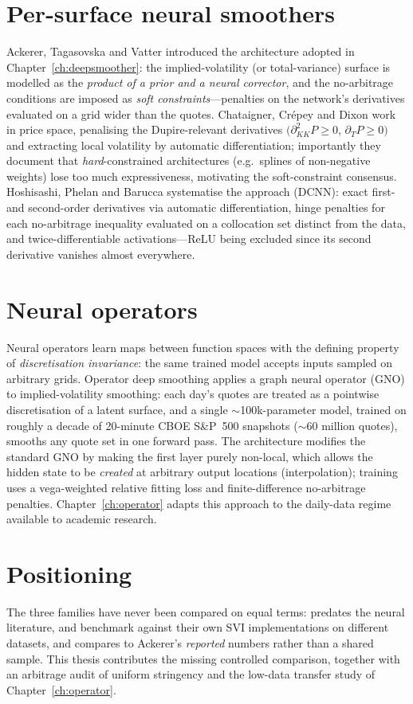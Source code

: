 \section{Per-surface neural smoothers}
Ackerer, Tagasovska and Vatter \cite{ackerer2020deep} introduced the architecture adopted in Chapter~\ref{ch:deepsmoother}: the implied-volatility (or total-variance) surface is modelled as the \emph{product of a prior and a neural corrector}, and the no-arbitrage conditions are imposed as \emph{soft constraints}---penalties on the network's derivatives evaluated on a grid wider than the quotes. Chataigner, Cr\'epey and Dixon \cite{chataigner2020deep} work in price space, penalising the Dupire-relevant derivatives $(\partial^2_{KK}P\ge0$, $\partial_T P\ge0)$ and extracting local volatility by automatic differentiation; importantly they document that \emph{hard}-constrained architectures (e.g.\ splines of non-negative weights) lose too much expressiveness, motivating the soft-constraint consensus. Hoshisashi, Phelan and Barucca \cite{hoshisashi2024noarbitrage} systematise the approach (DCNN): exact first- and second-order derivatives via automatic differentiation, hinge penalties for each no-arbitrage inequality evaluated on a collocation set distinct from the data, and twice-differentiable activations---ReLU being excluded since its second derivative vanishes almost everywhere.

\section{Neural operators}
Neural operators \cite{kovachki2023neural} learn maps between function spaces with the defining property of \emph{discretisation invariance}: the same trained model accepts inputs sampled on arbitrary grids. Operator deep smoothing \cite{gonon2024operator} applies a graph neural operator (GNO) to implied-volatility smoothing: each day's quotes are treated as a pointwise discretisation of a latent surface, and a single $\sim$100k-parameter model, trained on roughly a decade of 20-minute CBOE S\&P~500 snapshots ($\sim$60 million quotes), smooths any quote set in one forward pass. The architecture modifies the standard GNO by making the first layer purely non-local, which allows the hidden state to be \emph{created} at arbitrary output locations (interpolation); training uses a vega-weighted relative fitting loss and finite-difference no-arbitrage penalties. Chapter~\ref{ch:operator} adapts this approach to the daily-data regime available to academic research.

\section{Positioning}
The three families have never been compared on equal terms: \cite{gatheral2014arbitrage} predates the neural literature, \cite{ackerer2020deep} and \cite{hoshisashi2024noarbitrage} benchmark against their own SVI implementations on different datasets, and \cite{gonon2024operator} compares to Ackerer's \emph{reported} numbers rather than a shared sample. This thesis contributes the missing controlled comparison, together with an arbitrage audit of uniform stringency and the low-data transfer study of Chapter~\ref{ch:operator}.
